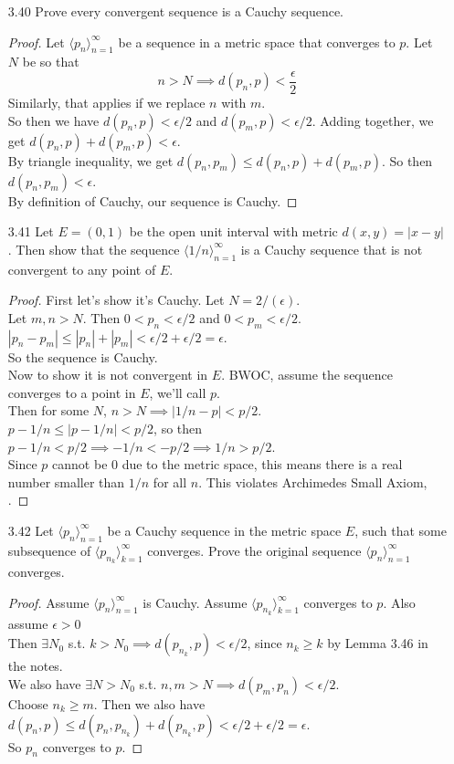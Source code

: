 \documentclass[14pt]{extarticle}
\begin{document}
\begin{enumerate}
		\item[3.40] Prove every convergent sequence is a Cauchy sequence.
		\begin{proof}
			Let $\langle p_n \rangle^\infty_{n=1}$ be a sequence in a metric space that converges to $p$. Let $N$ be so that 
			\[n > N \implies d(p_n,p) < \frac{\epsilon}{2}\]
			Similarly, that applies if we replace $n$ with $m$.\\
			So then we have $d(p_n,p) < \epsilon/2$ and $d(p_m,p) < \epsilon/2$. Adding together, we get $d(p_n,p) + d(p_m,p) < \epsilon$.\\
			By triangle inequality, we get $d(p_n,p_m) \leq d(p_n,p) + d(p_m,p)$. So then $d(p_n,p_m) < \epsilon$.\\
			By definition of Cauchy, our sequence is Cauchy.
		\end{proof}
		
		\item[3.41] Let $E = (0,1)$ be the open unit interval with metric $d(x,y) = |x-y|$. Then show that the sequence $\langle 1/n \rangle^\infty_{n=1}$ is a Cauchy sequence that is not convergent to any point of $E$.
		\begin{proof}
			First let's show it's Cauchy. Let $N = 2/(\epsilon)$.\\
			Let $m,n>N$. Then $0<p_n < \epsilon/2$ and $0<p_m<\epsilon/2$.\\
			$|p_n - p_m| \leq |p_n|+|p_m| <\epsilon/2 + \epsilon/2 = \epsilon$.\\
			So the sequence is Cauchy.\\
			Now to show it is not convergent in $E$. BWOC, assume the sequence converges to a point in $E$, we'll call $p$.\\
			Then for some $N$, $n>N \implies |1/n-p| < p/2$.\\
			$p-1/n \leq |p-1/n| < p/2$,
			so then $p-1/n < p/2 \implies -1/n < -p/2 \implies 1/n > p/2$.\\
			Since $p$ cannot be 0 due to the metric space, this means there is a real number smaller than $1/n$ for all $n$. This violates Archimedes Small Axiom, \contra.
		\end{proof}
		
		\item[3.42] Let $\langle p_n \rangle^\infty_{n=1}$ be a Cauchy sequence in the metric space $E$, such that some subsequence of $\langle p_{n_k} \rangle^\infty_{k=1}$ converges. Prove the original sequence $\langle p_n \rangle^\infty_{n=1}$ converges.
		\begin{proof}
			Assume $\langle p_n \rangle^\infty_{n=1}$ is Cauchy. Assume $\langle p_{n_k} \rangle^\infty_{k=1}$ converges to $p$. Also assume $\epsilon>0$\\
			Then $\exists N_0$ s.t. $k>N_0 \implies d(p_{n_k},p) <\epsilon/2$, since $n_k \geq k$ by Lemma 3.46 in the notes.\\
			We also have $\exists N > N_0$ s.t. $n,m>N \implies d(p_m,p_n)<\epsilon/2$.\\
			Choose $n_k \geq m$. Then we also have $d(p_n,p) \leq d(p_n,p_{n_k}) + d(p_{n_k},p) < \epsilon/2 + \epsilon/2 = \epsilon$.\\
			So $p_n$ converges to $p$.
		\end{proof}
		

\end{enumerate}
\end{document}
